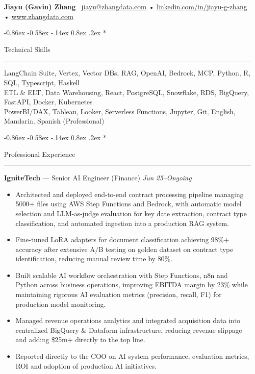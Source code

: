 \documentclass[10pt,letterpaper]{article}
\makeatletter
\renewcommand{\section}{\@startsection{section}{1}{\z@}%
  {-0.86ex \@plus -0.58ex \@minus -.14ex}%
  {0.8ex \@plus.2ex}%
  {\normalfont\large\bfseries}}
\newcommand{\name}{Jiayu (Gavin) Zhang}
\newcommand{\emailaddr}{jiayu@zhangdata.com}
\newcommand{\linkedin}{https://www.linkedin.com/in/jiayu-g-zhang}
\newcommand{\website}{https://www.zhangdata.com}
\makeatother
\begin{document}
{\LARGE\bfseries \name} \, \href{mailto:\emailaddr}{\emailaddr} • \href{\linkedin}{linkedin.com/in/jiayu-g-zhang} • \href{\website}{www.zhangdata.com}

\section*{Technical Skills\strut}
\hrule\vspace{0.2em}
LangChain Suite, Vertex, Vector DBs, RAG, OpenAI, Bedrock, MCP, Python, R, SQL, Typescript, Haskell\\
ETL \& ELT, Data Warehousing, React, PostgreSQL, Snowflake, RDS, BigQuery, FastAPI, Docker, Kubernetes\\
PowerBI/DAX, Tableau, Looker, Serverless Functions, Jupyter, Git, English, Mandarin, Spanish (Professional)

\section*{Professional Experience\strut}
\hrule\vspace{0.2em}

{\bfseries IgniteTech} — Senior AI Engineer (Finance) \hfill \textit{Jun 25--Ongoing}\vspace{-0.2em}
\begin{itemize}
  \item Architected and deployed end-to-end contract processing pipeline managing 5000+ files using AWS Step Functions and Bedrock, with automatic model selection and LLM-as-judge evaluation for key date extraction, contract type classification, and automated ingestion into a production RAG system.
  \item Fine-tuned LoRA adapters for document classification achieving 98\%+ accuracy after extensive A/B testing on golden dataset on contract type identification, reducing manual review time by 80\%.
  \item Built scalable AI workflow orchestration with Step Functions, n8n and Python across business operations, improving EBITDA margin by 23\% while maintaining rigorous AI evaluation metrics (precision, recall, F1) for production model monitoring.
  \item Managed revenue operations analytics and integrated acquisition data into centralized BigQuery \& Dataform infrastructure, reducing revenue slippage and adding \$25m+ directly to the top line.
  \item Reported directly to the COO on AI system performance, evaluation metrics, ROI and adoption of production AI initiatives.
\end{itemize}
\end{document}
